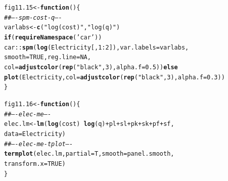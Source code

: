 \documentclass[12pt, a4paper,  BCOR=8.25mm, DIV=15]{scrartcl}\usepackage[]{graphicx}\usepackage[]{color}
\makeatletter
\newcommand{\hlnum}[1]{\textcolor[rgb]{0.686,0.059,0.569}{#1}}%
\newcommand{\hlstr}[1]{\textcolor[rgb]{0.192,0.494,0.8}{#1}}%
\newcommand{\hlcom}[1]{\textcolor[rgb]{0.678,0.584,0.686}{\textit{#1}}}%
\newcommand{\hlopt}[1]{\textcolor[rgb]{0,0,0}{#1}}%
\newcommand{\hlstd}[1]{\textcolor[rgb]{0.345,0.345,0.345}{#1}}%
\newcommand{\hlkwa}[1]{\textcolor[rgb]{0.161,0.373,0.58}{\textbf{#1}}}%
\newcommand{\hlkwb}[1]{\textcolor[rgb]{0.69,0.353,0.396}{#1}}%
\newcommand{\hlkwc}[1]{\textcolor[rgb]{0.333,0.667,0.333}{#1}}%
\newcommand{\hlkwd}[1]{\textcolor[rgb]{0.737,0.353,0.396}{\textbf{#1}}}%
\newenvironment{kframe}{%
 \def\at@end@of@kframe{}%
 \ifinner\ifhmode%
  \def\at@end@of@kframe{\end{minipage}}%
  \begin{minipage}{\columnwidth}%
 \fi\fi%
 \def\FrameCommand##1{\hskip\@totalleftmargin \hskip-\fboxsep
 \colorbox{shadecolor}{##1}\hskip-\fboxsep
     \hskip-\linewidth \hskip-\@totalleftmargin \hskip\columnwidth}%
 \MakeFramed {\advance\hsize-\width
   \@totalleftmargin\z@ \linewidth\hsize
   \@setminipage}}%
 {\par\unskip\endMakeFramed%
 \at@end@of@kframe}
\newenvironment{knitrout}{}{} %
\makeatother
\begin{document}
\begin{knitrout}
\color{fgcolor}\begin{kframe}
\begin{alltt}
\hlstd{fig11.15} \hlkwb{<-} \hlkwa{function}\hlstd{()\{}
\hlcom{## ---- spm-cost-q ----}
\hlstd{varlabs} \hlkwb{<-} \hlkwd{c}\hlstd{(}\hlstr{"log(cost)"}\hlstd{,} \hlstr{"log(q)"}\hlstd{)}
\hlkwa{if}\hlstd{(}\hlkwd{requireNamespace}\hlstd{(}\hlstr{'car'}\hlstd{))}
\hlstd{car}\hlopt{::}\hlkwd{spm}\hlstd{(}\hlkwd{log}\hlstd{(Electricity[,}\hlnum{1}\hlopt{:}\hlnum{2}\hlstd{]),} \hlkwc{var.labels}\hlstd{=varlabs,}
    \hlkwc{smooth}\hlstd{=}\hlnum{TRUE}\hlstd{,} \hlkwc{reg.line}\hlstd{=}\hlnum{NA}\hlstd{,}
    \hlkwc{col}\hlstd{=}\hlkwd{adjustcolor}\hlstd{(}\hlkwd{rep}\hlstd{(}\hlstr{"black"}\hlstd{,}\hlnum{3}\hlstd{),} \hlkwc{alpha.f}\hlstd{=}\hlnum{0.5}\hlstd{))} \hlkwa{else}
    \hlkwd{plot}\hlstd{(Electricity,} \hlkwc{col}\hlstd{=}\hlkwd{adjustcolor}\hlstd{(}\hlkwd{rep}\hlstd{(}\hlstr{"black"}\hlstd{,}\hlnum{3}\hlstd{),} \hlkwc{alpha.f}\hlstd{=}\hlnum{0.3}\hlstd{))}
\hlstd{\}}
\end{alltt}
\end{kframe}
\end{knitrout}

\begin{knitrout}
\color{fgcolor}\begin{kframe}
\begin{alltt}
\hlstd{fig11.16} \hlkwb{<-} \hlkwa{function}\hlstd{()\{}
\hlcom{## ---- elec-me ----}
\hlstd{elec.lm} \hlkwb{<-} \hlkwd{lm}\hlstd{(}\hlkwd{log}\hlstd{(cost)} \hlopt{~} \hlkwd{log}\hlstd{(q)}\hlopt{+}\hlstd{pl}\hlopt{+}\hlstd{sl}\hlopt{+}\hlstd{pk}\hlopt{+}\hlstd{sk}\hlopt{+}\hlstd{pf}\hlopt{+}\hlstd{sf,}
              \hlkwc{data}\hlstd{=Electricity)}
\hlcom{## ---- elec-me-tplot ----}
\hlkwd{termplot}\hlstd{(elec.lm,} \hlkwc{partial}\hlstd{=T,} \hlkwc{smooth}\hlstd{=panel.smooth,}
         \hlkwc{transform.x}\hlstd{=}\hlnum{TRUE}\hlstd{)}
\hlstd{\}}
\end{alltt}
\end{kframe}
\end{knitrout}
\end{document}

